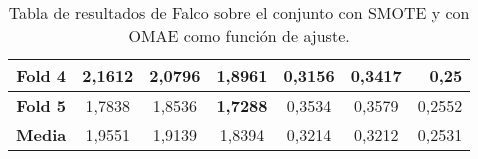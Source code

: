 \begin{table}[H]
{\begin{tabular}{|crrrrrr|}
\multicolumn{1}{|c|}{\textbf{Fold 4}} & \multicolumn{1}{c|}{2,1612}            & \multicolumn{1}{c|}{2,0796}              & \multicolumn{1}{c|}{1,8961}          & \multicolumn{1}{c|}{0,3156}            & \multicolumn{1}{c|}{0,3417}              & 0,25                               \\ \hline
\multicolumn{1}{|c|}{\textbf{Fold 5}} & \multicolumn{1}{c|}{1,7838}            & \multicolumn{1}{c|}{1,8536}              & \multicolumn{1}{c|}{\textbf{1,7288}} & \multicolumn{1}{c|}{0,3534}            & \multicolumn{1}{c|}{0,3579}              & 0,2552                             \\ \hline
\multicolumn{1}{|c|}{\textbf{Media}}  & \multicolumn{1}{c|}{1,9551}           & \multicolumn{1}{c|}{1,9139}             & \multicolumn{1}{c|}{1,8394}         & \multicolumn{1}{c|}{0,3214}            & \multicolumn{1}{c|}{0,3212}             & 0,2531                            \\ \hline
\end{tabular}%
}
\caption{Tabla de resultados de Falco sobre el conjunto con SMOTE y con OMAE como función de ajuste.}\label{tablaFALCOconSMOTEconOMAE}

\end{table}


